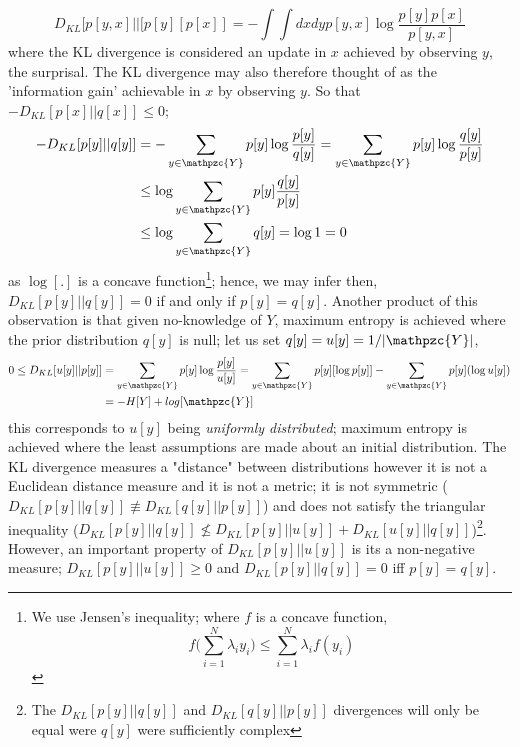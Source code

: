 \documentclass[7pt]{article}
\begin{document}
$$
D_{KL} [p[y,x]||[p[y][p[x]] =  - \int \int dx dy p[y,x] \log \dfrac{ p[y]p[x] }{p[y,x] }
$$
where the KL divergence is considered an update in $x$ achieved by observing $y$, the surprisal. The KL divergence may also therefore thought of as the 'information gain' achievable in $x$ by observing $y$. So that $-D_{KL} [p[x]||q[x]] \leq 0$;
\begin{equation}
\begin{split}
-D_{KL} [p[y]||q[y]] & = - \sum_{y\in\mathpzc{Y}} p[y] \log\dfrac{p[y] }{q[y] } = \sum_{y\in\mathpzc{Y}} p[y]  \log\dfrac{q[y]}{p[y]} \\
& \leq \log \sum_{y\in\mathpzc{Y}} p[y] \dfrac{q[y]}{p[y]} \\
& \leq \log \sum_{y\in\mathpzc{Y}} {q[y]} = \log 1 = 0  \\
\end{split}
\end{equation}
as $\log[.]$ is a concave function\footnote{We use Jensen's inequality; where $f$ is a concave function, $$ f \Bigr( \sum_{i=1}^N \lambda_i y_i \Bigr) \leq \sum_{i=1}^N \lambda_i f(y_i)$$ }; hence, we may infer then, $D_{KL} [p[y]||q[y]] = 0$ if and only if $p[y] = q[y]$. Another product of this observation is that given no-knowledge of $Y$, maximum entropy is achieved where the prior distribution $q[y]$ is null; let us set $q[y] = u[y] = 1/|\mathpzc{Y}|$,
\begin{equation}
\begin{split}
0 \leq  D_{KL} [u[y]||p[y]] & = \sum_{y\in\mathpzc{Y}} {p[y]} \log\dfrac{p[y] }{u[y] } = \sum_{y\in\mathpzc{Y}} {p[y]} [\log p[y]] - \sum_{y\in\mathpzc{Y}} {p[y]} (\log u[y])\\
 & = -H[Y] + log[\mathpzc{Y}]
\end{split}
\end{equation}
this corresponds to $u[y]$ being  \emph{uniformly distributed}; maximum entropy is achieved where the least assumptions are made about an initial distribution. The KL divergence measures a "distance" between distributions however it is not a Euclidean distance measure and it is not a metric; it is not symmetric ($D_{KL} [p[y]||q[y]] \not\equiv D_{KL} [q[y]||p[y]]$) and does not satisfy the triangular inequality ($D_{KL} [p[y]||q[y]] \not\leq D_{KL} [p[y]||u[y]] + D_{KL} [u[y]||q[y]]  $)\footnote{The $D_{KL} [p[y]||q[y]]$ and $D_{KL} [q[y]||p[y]]$ divergences will only be equal were $q[y]$ were sufficiently complex}. However, an important property of $D_{KL} [p[y]||u[y]]$ is its  a non-negative measure;  $D_{KL} [p[y]||u[y]] \geq 0$ and $D_{KL} [p[y]||q[y]] = 0$ iff $p[y] = q[y]$.
\end{document}
